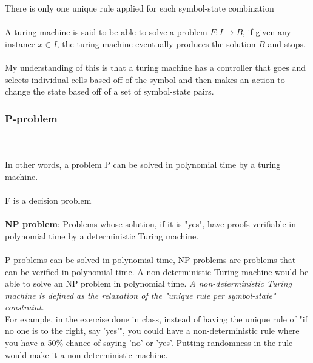 There is only one unique rule applied for each symbol-state combination
\\ \\ 
A turing machine is said to be able to solve a problem $F : I \to B $, if given any instance $x \in I$, the turing machine eventually produces the solution $B$ and stops.
\\ \\
My understanding of this is that a turing machine has a controller that goes and selects individual cells based off of the symbol and then makes an action to change the state based off of a set of symbol-state pairs.

\subsubsection{P-problem}
\\ \\ 
In other words, a problem P can be solved in polynomial time by a turing machine.
\\ \\ 
F is a decision problem
\\ \\ 
\textbf{NP problem}: Problems whose solution, if it is "yes", have proofs verifiable in polynomial time by a deterministic Turing machine.
\\ \\ 
P problems can be solved in polynomial time, NP problems are problems that can be verified in polynomial time. A non-deterministic Turing machine would be able to solve an NP problem in polynomial time. \textit{A non-deterministic Turing machine is defined as the relaxation of the "unique rule per symbol-state" constraint.} 
\\
For example, in the exercise done in class, instead of having the unique rule of "if no one is to the right, say 'yes'", you could have a non-deterministic rule where you have a 50\% chance of saying 'no' or 'yes'. Putting randomness in the rule would make it a non-deterministic machine.

